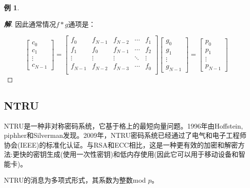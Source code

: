 \documentclass{article}
\theoremstyle{definition}
\newtheorem{example}{\indent 例}
\newenvironment{solution}{\begin{proof}[\indent\bf 解]}{\end{proof}}
\begin{document}
\begin{example}
\begin{solution}
因此通常情况$f * g$通项是：

$$
\left[\begin{array}{c}
c_{0} \\
c_{1} \\
\vdots \\
c_{N-1}
\end{array}\right]=\left[\begin{array}{ccccc}
f_{0} & f_{N-1} & f_{N-2}  &  \cdots &   f_{1}   \\
f_{1} & f_{0} & f_{N-1}  &  \cdots &   f_{2}  \\
\vdots & \vdots& \vdots  &  \ddots &   \vdots  \\
f_{N-1} & f_{N-2} & f_{N-3} &  \cdots &  f_{0} \\ 
\end{array}\right]\left[\begin{array}{c}
g_{0} \\
g_{1} \\
\vdots \\
g_{N-1}
\end{array}\right]=\left[\begin{array}{c}
p_{0} \\
p_{1} \\
\vdots \\
p_{N-1}
\end{array}\right]
$$
\end{solution}
\end{example}

\subsection{NTRU}
NTRU是一种非对称密码系统，它基于格上的最短向量问题。1996年由Hoffstein, piphher和Silverman发现。2009年，NTRU密码系统已经通过了电气和电子工程师协会(IEEE)的标准化认证。与RSA和ECC相比，这是一种更有效的加密和解密方法:更快的密钥生成(使用一次性密钥)和低内存使用(因此它可以用于移动设备和智能卡)。

NTRU的消息为多项式形式，其系数为整数mod $p$。

~\\
\end{document}

